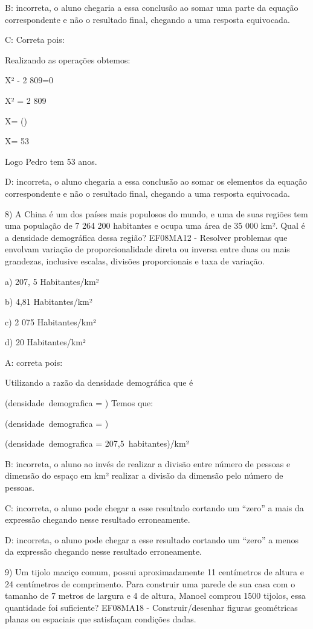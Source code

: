 B: incorreta, o aluno chegaria a essa conclusão ao somar uma parte da
equação correspondente e não o resultado final, chegando a uma resposta
equivocada.

C: Correta pois:

Realizando as operações obtemos:

X² - 2 809=0

X² = 2 809

X= ()

X= 53

Logo Pedro tem 53 anos.

D: incorreta, o aluno chegaria a essa conclusão ao somar os elementos da
equação correspondente e não o resultado final, chegando a uma resposta
equivocada.

8) A China é um dos países mais populosos do mundo, e uma de suas
regiões tem uma população de 7 264 200 habitantes e ocupa uma área de 35
000 km². Qual é a densidade demográfica dessa região? EF08MA12 -
Resolver problemas que envolvam variação de proporcionalidade direta ou
inversa entre duas ou mais grandezas, inclusive escalas, divisões
proporcionais e taxa de variação.

a) 207, 5 Habitantes/km²

b) 4,81 Habitantes/km²

c) 2 075 Habitantes/km²

d) 20 Habitantes/km²

A: correta pois:

Utilizando a razão da densidade demográfica que é

(densidade\ demografica = )
Temos que:

(densidade\ demografica = )

(densidade\ demografica = 207,5\ habitantes)/km²

B: incorreta, o aluno ao invés de realizar a divisão entre número de
pessoas e dimensão do espaço em km² realizar a divisão da dimensão pelo
número de pessoas.

C: incorreta, o aluno pode chegar a esse resultado cortando um ``zero''
a mais da expressão chegando nesse resultado erroneamente.

D: incorreta, o aluno pode chegar a esse resultado cortando um ``zero''
a menos da expressão chegando nesse resultado erroneamente.

9) Um tijolo maciço comum, possui aproximadamente 11 centímetros de
altura e 24 centímetros de comprimento. Para construir uma parede de sua
casa com o tamanho de 7 metros de largura e 4 de altura, Manoel comprou
1500 tijolos, essa quantidade foi suficiente? EF08MA18 -
Construir/desenhar figuras geométricas planas ou espaciais que
satisfaçam condições dadas.

